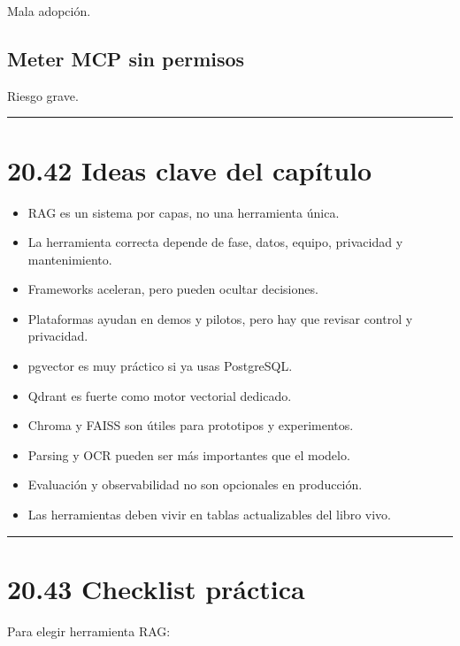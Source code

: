 Mala adopción.

\subsection{Meter MCP sin permisos}\label{meter-mcp-sin-permisos}

Riesgo grave.

\begin{center}\rule{0.5\linewidth}{0.5pt}\end{center}

\section{20.42 Ideas clave del
capítulo}\label{ideas-clave-del-capuxedtulo-19}

\begin{itemize}
\tightlist
\item
  RAG es un sistema por capas, no una herramienta única.
\item
  La herramienta correcta depende de fase, datos, equipo, privacidad y
  mantenimiento.
\item
  Frameworks aceleran, pero pueden ocultar decisiones.
\item
  Plataformas ayudan en demos y pilotos, pero hay que revisar control y
  privacidad.
\item
  pgvector es muy práctico si ya usas PostgreSQL.
\item
  Qdrant es fuerte como motor vectorial dedicado.
\item
  Chroma y FAISS son útiles para prototipos y experimentos.
\item
  Parsing y OCR pueden ser más importantes que el modelo.
\item
  Evaluación y observabilidad no son opcionales en producción.
\item
  Las herramientas deben vivir en tablas actualizables del libro vivo.
\end{itemize}

\begin{center}\rule{0.5\linewidth}{0.5pt}\end{center}

\section{20.43 Checklist práctica}\label{checklist-pruxe1ctica-19}

Para elegir herramienta RAG:

